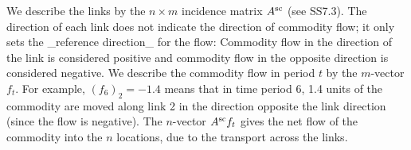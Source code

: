 We describe the links by the \(n\times m\) incidence matrix \(A^{\rm sc}\) (see SS7.3). The direction of each link does not indicate the direction of commodity flow; it only sets the _reference direction_ for the flow: Commodity flow in the direction of the link is considered positive and commodity flow in the opposite direction is considered negative. We describe the commodity flow in period \(t\) by the \(m\)-vector \(f_{t}\). For example, \((f_{6})_{2}=-1.4\) means that in time period 6, 1.4 units of the commodity are moved along link 2 in the direction opposite the link direction (since the flow is negative). The \(n\)-vector \(A^{\rm sc}f_{t}\) gives the net flow of the commodity into the \(n\) locations, due to the transport across the links.

 